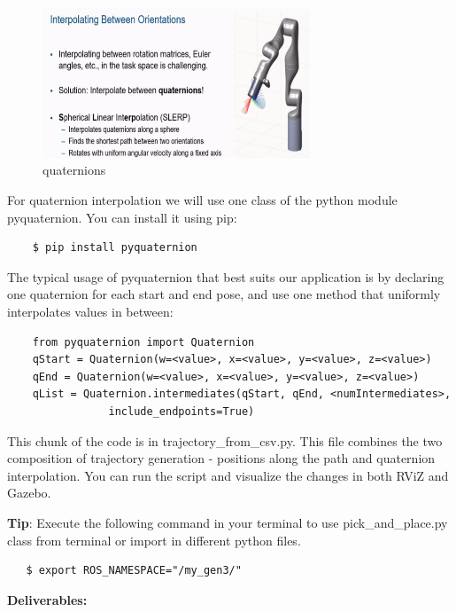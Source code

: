 \documentclass[12pt]{article}
\begin{document}
\begin{figure}[H]
    \centering\includegraphics[width=8cm]{images/lab72.png}
    \caption{quaternions}\label{fig:curves}
    \end{figure}

For quaternion interpolation we will use one class of the python module pyquaternion. You can install it using pip:
\begin{verbatim}
    $ pip install pyquaternion
\end{verbatim}

The typical usage of pyquaternion that best suits our application is by declaring one quaternion for each start and end pose, and use one method that uniformly interpolates values in between:
\begin{verbatim}
    from pyquaternion import Quaternion
    qStart = Quaternion(w=<value>, x=<value>, y=<value>, z=<value>)
    qEnd = Quaternion(w=<value>, x=<value>, y=<value>, z=<value>)
    qList = Quaternion.intermediates(qStart, qEnd, <numIntermediates>, 
                include_endpoints=True)
\end{verbatim}

This chunk of the code is in trajectory\_from\_csv.py. This file combines the two composition of trajectory generation - positions along the path and quaternion interpolation. You can run the script and visualize the changes in both RViZ and Gazebo.

\textbf{Tip}: Execute the following command in your terminal to use pick\_and\_place.py class from terminal or import in different python files.
\begin{verbatim}
   $ export ROS_NAMESPACE="/my_gen3/"
\end{verbatim}

\textbf{Deliverables:}
\end{document}
